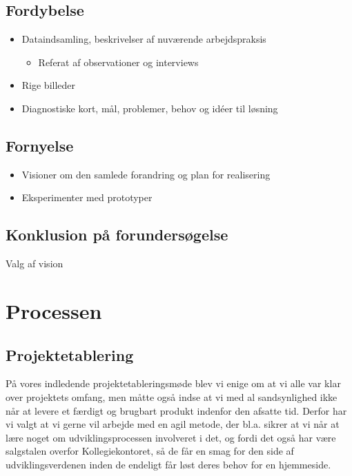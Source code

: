\documentclass[12pt, a4paper]{report}
\begin{document}
\section*{Fordybelse}
\begin{itemize}
\item Dataindsamling, beskrivelser af nuværende arbejdspraksis
\begin{itemize}
\item Referat af observationer og interviews
\end{itemize}
\item Rige billeder
\item Diagnostiske kort, mål, problemer, behov og idéer til løsning
\end{itemize}

\section*{Fornyelse}
\begin{itemize}
\item Visioner om den samlede forandring
\Strategi og plan for realisering
\item Eksperimenter med prototyper
\end{itemize}

\section*{Konklusion på forundersøgelse}
Valg af vision

\chapter*{Processen}

\section*{Projektetablering}
På vores indledende projektetableringsmøde blev vi enige om at vi alle var klar over projektets omfang, men måtte også indse at vi med al sandsynlighed ikke når at levere et færdigt og brugbart produkt indenfor den afsatte tid.
Derfor har vi valgt at vi gerne vil arbejde med en agil metode, der bl.a. sikrer at vi når at lære noget om udviklingsprocessen involveret i det, og fordi det også har være salgstalen overfor Kollegiekontoret, så de får en smag for den side af udviklingsverdenen inden de endeligt får løst deres behov for en hjemmeside.

\end{document}

